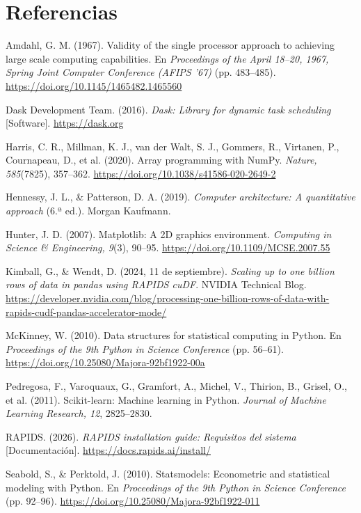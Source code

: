 \documentclass[12pt,letterpaper]{article}
\begin{document}
\section{Referencias}
\label{sec:referencias}
{\raggedright\setlength{\parindent}{-1.27cm}\setlength{\leftskip}{1.27cm}\setlength{\parskip}{6pt}

Amdahl, G. M. (1967). Validity of the single processor approach to achieving large scale computing capabilities. En \textit{Proceedings of the April 18--20, 1967, Spring Joint Computer Conference (AFIPS '67)} (pp. 483--485). \url{https://doi.org/10.1145/1465482.1465560}\par
Dask Development Team. (2016). \textit{Dask: Library for dynamic task scheduling} [Software]. \url{https://dask.org}\par
Harris, C. R., Millman, K. J., van der Walt, S. J., Gommers, R., Virtanen, P., Cournapeau, D., et al. (2020). Array programming with NumPy. \textit{Nature, 585}(7825), 357--362. \url{https://doi.org/10.1038/s41586-020-2649-2}\par
Hennessy, J. L., \& Patterson, D. A. (2019). \textit{Computer architecture: A quantitative approach} (6.ª ed.). Morgan Kaufmann.\par
Hunter, J. D. (2007). Matplotlib: A 2D graphics environment. \textit{Computing in Science \& Engineering, 9}(3), 90--95. \url{https://doi.org/10.1109/MCSE.2007.55}\par
Kimball, G., \& Wendt, D. (2024, 11 de septiembre). \textit{Scaling up to one billion rows of data in pandas using RAPIDS cuDF}. NVIDIA Technical Blog. \url{https://developer.nvidia.com/blog/processing-one-billion-rows-of-data-with-rapids-cudf-pandas-accelerator-mode/}\par
McKinney, W. (2010). Data structures for statistical computing in Python. En \textit{Proceedings of the 9th Python in Science Conference} (pp. 56--61). \url{https://doi.org/10.25080/Majora-92bf1922-00a}\par
Pedregosa, F., Varoquaux, G., Gramfort, A., Michel, V., Thirion, B., Grisel, O., et al. (2011). Scikit-learn: Machine learning in Python. \textit{Journal of Machine Learning Research, 12}, 2825--2830.\par
RAPIDS. (2026). \textit{RAPIDS installation guide: Requisitos del sistema} [Documentación]. \url{https://docs.rapids.ai/install/}\par
Seabold, S., \& Perktold, J. (2010). Statsmodels: Econometric and statistical modeling with Python. En \textit{Proceedings of the 9th Python in Science Conference} (pp. 92--96). \url{https://doi.org/10.25080/Majora-92bf1922-011}\par
}
\end{document}
